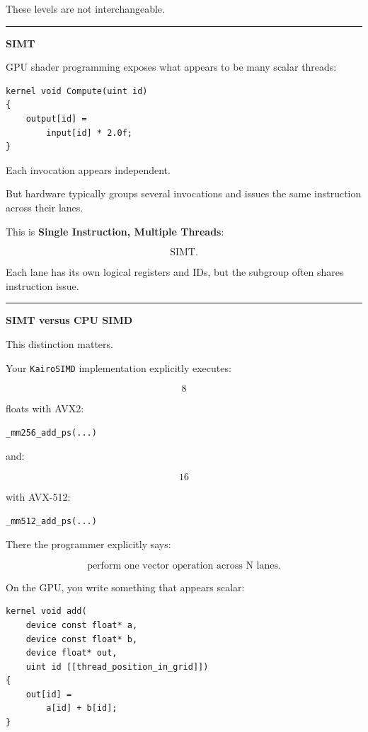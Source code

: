 These levels are not interchangeable.

\begin{center}\rule{0.5\linewidth}{0.5pt}\end{center}

\textbf{SIMT}

GPU shader programming exposes what appears to be many scalar threads:

\protect{}\label{e937zu}%
\begin{verbatim}
kernel void Compute(uint id)
{
    output[id] =
        input[id] * 2.0f;
}
\end{verbatim}

Each invocation appears independent.

But hardware typically groups several invocations and issues the same instruction across their lanes.

This is \textbf{Single Instruction, Multiple Threads}:

\[
\boxed{\text{SIMT}.}
\]

Each lane has its own logical registers and IDs, but the subgroup often shares instruction issue.

\begin{center}\rule{0.5\linewidth}{0.5pt}\end{center}

\textbf{SIMT versus CPU SIMD}

This distinction matters.

Your \texttt{KairoSIMD} implementation explicitly executes:

\[
8
\]

floats with AVX2:

\protect{}\label{qpohrx}%
\begin{verbatim}
_mm256_add_ps(...)
\end{verbatim}

and:

\[
16
\]

with AVX-512:

\protect{}\label{6vk2sf}%
\begin{verbatim}
_mm512_add_ps(...)
\end{verbatim}

There the programmer explicitly says:

\[
\boxed{\text{perform one vector operation across N lanes}.}
\]

On the GPU, you write something that appears scalar:

\protect{}\label{2o38s4}%
\begin{verbatim}
kernel void add(
    device const float* a,
    device const float* b,
    device float* out,
    uint id [[thread_position_in_grid]])
{
    out[id] =
        a[id] + b[id];
}
\end{verbatim}


